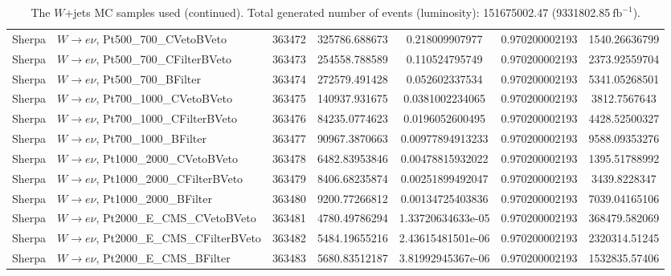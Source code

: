 \begin{table}[h]
\begin{center}
\begin{tabular}{|l|l|c|
S[table-parse-only, round-precision=4]|
S[table-parse-only, round-precision=3]|
S[table-parse-only, round-precision=3]|
S[table-parse-only, round-precision=3]|
}
Sherpa & $W\rightarrow e\nu$, Pt500\_700\_CVetoBVeto & 363472 & 325786.688673 & 0.218009907977 & 0.970200002193 & 1540.26636799 \\
Sherpa & $W\rightarrow e\nu$, Pt500\_700\_CFilterBVeto & 363473 & 254558.788589 & 0.110524795749 & 0.970200002193 & 2373.92559704 \\
Sherpa & $W\rightarrow e\nu$, Pt500\_700\_BFilter & 363474 & 272579.491428 & 0.052602337534 & 0.970200002193 & 5341.05268501 \\
Sherpa & $W\rightarrow e\nu$, Pt700\_1000\_CVetoBVeto & 363475 & 140937.931675 & 0.0381002234065 & 0.970200002193 & 3812.7567643 \\
Sherpa & $W\rightarrow e\nu$, Pt700\_1000\_CFilterBVeto & 363476 & 84235.0774623 & 0.0196052600495 & 0.970200002193 & 4428.52500327 \\
Sherpa & $W\rightarrow e\nu$, Pt700\_1000\_BFilter & 363477 & 90967.3870663 & 0.00977894913233 & 0.970200002193 & 9588.09353276 \\
Sherpa & $W\rightarrow e\nu$, Pt1000\_2000\_CVetoBVeto & 363478 & 6482.83953846 & 0.00478815932022 & 0.970200002193 & 1395.51788992 \\
Sherpa & $W\rightarrow e\nu$, Pt1000\_2000\_CFilterBVeto & 363479 & 8406.68235874 & 0.00251899492047 & 0.970200002193 & 3439.8228347 \\
Sherpa & $W\rightarrow e\nu$, Pt1000\_2000\_BFilter & 363480 & 9200.77266812 & 0.00134725403836 & 0.970200002193 & 7039.04165106 \\
Sherpa & $W\rightarrow e\nu$, Pt2000\_E\_CMS\_CVetoBVeto & 363481 & 4780.49786294 & 1.33720634633e-05 & 0.970200002193 & 368479.582069 \\
Sherpa & $W\rightarrow e\nu$, Pt2000\_E\_CMS\_CFilterBVeto & 363482 & 5484.19655216 & 2.43615481501e-06 & 0.970200002193 & 2320314.51245 \\
Sherpa & $W\rightarrow e\nu$, Pt2000\_E\_CMS\_BFilter & 363483 & 5680.83512187 & 3.81992945367e-06 & 0.970200002193 & 1532835.57406 \\
\bottomrule
\end{tabular}
\caption{The $W$+jets MC samples used (continued). Total generated number of events (luminosity): 151675002.47 (9331802.85$~\mathrm{fb}^{-1}$).}
\label{tab:app:datamcW_sherpa_220}
\end{center}
\end{table}
